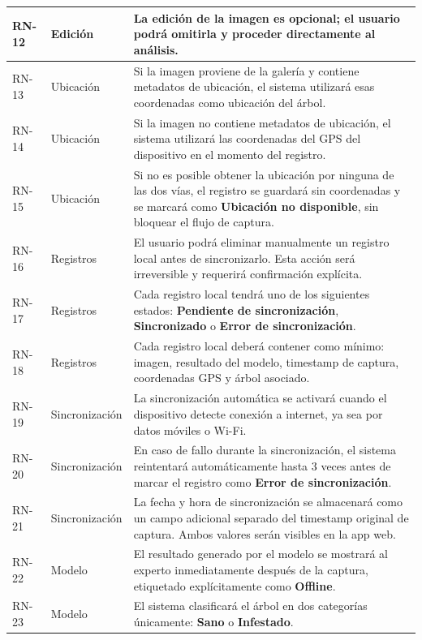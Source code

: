 \begin{longtable}{|>{\centering\arraybackslash}m{1.8cm}|>{\centering\arraybackslash}m{2.5cm}|m{9.5cm}|}
\hline
RN-12 & Edición & La edición de la imagen es opcional; el usuario podrá omitirla y proceder directamente al análisis. \\
\hline
RN-13 & Ubicación & Si la imagen proviene de la galería y contiene metadatos de ubicación, el sistema utilizará esas coordenadas como ubicación del árbol. \\
\hline
RN-14 & Ubicación & Si la imagen no contiene metadatos de ubicación, el sistema utilizará las coordenadas del GPS del dispositivo en el momento del registro. \\
\hline
RN-15 & Ubicación & Si no es posible obtener la ubicación por ninguna de las dos vías, el registro se guardará sin coordenadas y se marcará como \textbf{Ubicación no disponible}, sin bloquear el flujo de captura. \\
\hline
RN-16 & Registros & El usuario podrá eliminar manualmente un registro local antes de sincronizarlo. Esta acción será irreversible y requerirá confirmación explícita. \\
\hline
RN-17 & Registros & Cada registro local tendrá uno de los siguientes estados: \textbf{Pendiente de sincronización}, \textbf{Sincronizado} o \textbf{Error de sincronización}. \\
\hline
RN-18 & Registros & Cada registro local deberá contener como mínimo: imagen, resultado del modelo, timestamp de captura, coordenadas GPS y árbol asociado. \\
\hline
RN-19 & Sincronización & La sincronización automática se activará cuando el dispositivo detecte conexión a internet, ya sea por datos móviles o Wi-Fi. \\
\hline
RN-20 & Sincronización & En caso de fallo durante la sincronización, el sistema reintentará automáticamente hasta 3 veces antes de marcar el registro como \textbf{Error de sincronización}. \\
\hline
RN-21 & Sincronización & La fecha y hora de sincronización se almacenará como un campo adicional separado del timestamp original de captura. Ambos valores serán visibles en la app web. \\
\hline
RN-22 & Modelo & El resultado generado por el modelo se mostrará al experto inmediatamente después de la captura, etiquetado explícitamente como \textbf{Offline}. \\
\hline

RN-23 & Modelo & El sistema clasificará el árbol en dos categorías únicamente: \textbf{Sano} o \textbf{Infestado}. \\
\hline


\end{longtable}
